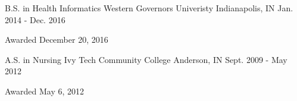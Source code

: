 

\begin{cventries}

  \cventry
    {B.S. in Health Informatics} %
    {Western Governors Univeristy} %
    {Indianapolis, IN} %
    {Jan. 2014 - Dec. 2016} %
    {
      \begin{cvitems} %
        \item {Awarded December 20, 2016}
      \end{cvitems}
    }

  \cventry
    {A.S. in Nursing} %
    {Ivy Tech Community College} %
    {Anderson, IN} %
    {Sept. 2009 - May 2012} %
    {
      \begin{cvitems} %
      \item {Awarded May 6, 2012}
      \end{cvitems}
    }

\end{cventries}
